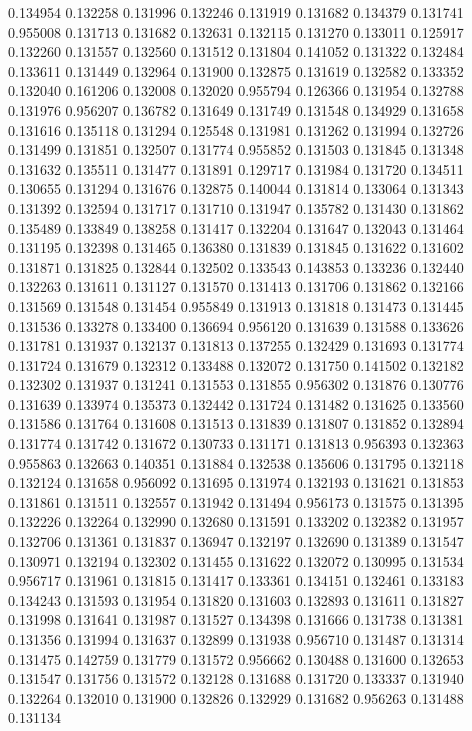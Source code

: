0.134954
0.132258
0.131996
0.132246
0.131919
0.131682
0.134379
0.131741
0.955008
0.131713
0.131682
0.132631
0.132115
0.131270
0.133011
0.125917
0.132260
0.131557
0.132560
0.131512
0.131804
0.141052
0.131322
0.132484
0.133611
0.131449
0.132964
0.131900
0.132875
0.131619
0.132582
0.133352
0.132040
0.161206
0.132008
0.132020
0.955794
0.126366
0.131954
0.132788
0.131976
0.956207
0.136782
0.131649
0.131749
0.131548
0.134929
0.131658
0.131616
0.135118
0.131294
0.125548
0.131981
0.131262
0.131994
0.132726
0.131499
0.131851
0.132507
0.131774
0.955852
0.131503
0.131845
0.131348
0.131632
0.135511
0.131477
0.131891
0.129717
0.131984
0.131720
0.134511
0.130655
0.131294
0.131676
0.132875
0.140044
0.131814
0.133064
0.131343
0.131392
0.132594
0.131717
0.131710
0.131947
0.135782
0.131430
0.131862
0.135489
0.133849
0.138258
0.131417
0.132204
0.131647
0.132043
0.131464
0.131195
0.132398
0.131465
0.136380
0.131839
0.131845
0.131622
0.131602
0.131871
0.131825
0.132844
0.132502
0.133543
0.143853
0.133236
0.132440
0.132263
0.131611
0.131127
0.131570
0.131413
0.131706
0.131862
0.132166
0.131569
0.131548
0.131454
0.955849
0.131913
0.131818
0.131473
0.131445
0.131536
0.133278
0.133400
0.136694
0.956120
0.131639
0.131588
0.133626
0.131781
0.131937
0.132137
0.131813
0.137255
0.132429
0.131693
0.131774
0.131724
0.131679
0.132312
0.133488
0.132072
0.131750
0.141502
0.132182
0.132302
0.131937
0.131241
0.131553
0.131855
0.956302
0.131876
0.130776
0.131639
0.133974
0.135373
0.132442
0.131724
0.131482
0.131625
0.133560
0.131586
0.131764
0.131608
0.131513
0.131839
0.131807
0.131852
0.132894
0.131774
0.131742
0.131672
0.130733
0.131171
0.131813
0.956393
0.132363
0.955863
0.132663
0.140351
0.131884
0.132538
0.135606
0.131795
0.132118
0.132124
0.131658
0.956092
0.131695
0.131974
0.132193
0.131621
0.131853
0.131861
0.131511
0.132557
0.131942
0.131494
0.956173
0.131575
0.131395
0.132226
0.132264
0.132990
0.132680
0.131591
0.133202
0.132382
0.131957
0.132706
0.131361
0.131837
0.136947
0.132197
0.132690
0.131389
0.131547
0.130971
0.132194
0.132302
0.131455
0.131622
0.132072
0.130995
0.131534
0.956717
0.131961
0.131815
0.131417
0.133361
0.134151
0.132461
0.133183
0.134243
0.131593
0.131954
0.131820
0.131603
0.132893
0.131611
0.131827
0.131998
0.131641
0.131987
0.131527
0.134398
0.131666
0.131738
0.131381
0.131356
0.131994
0.131637
0.132899
0.131938
0.956710
0.131487
0.131314
0.131475
0.142759
0.131779
0.131572
0.956662
0.130488
0.131600
0.132653
0.131547
0.131756
0.131572
0.132128
0.131688
0.131720
0.133337
0.131940
0.132264
0.132010
0.131900
0.132826
0.132929
0.131682
0.956263
0.131488
0.131134
